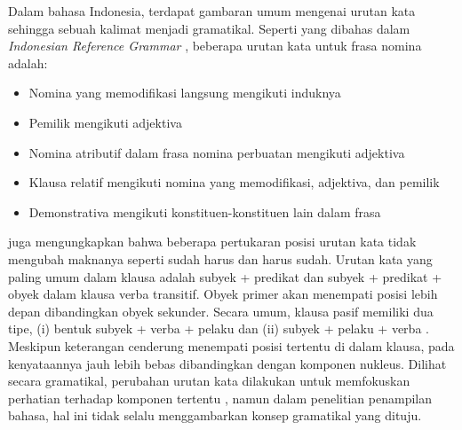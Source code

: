 Dalam bahasa Indonesia, terdapat gambaran umum mengenai urutan kata sehingga sebuah kalimat menjadi gramatikal. Seperti yang dibahas dalam \textit{Indonesian Reference Grammar} \citep{sneddon2010indonesian}, beberapa urutan kata untuk frasa nomina adalah:
\begin{itemize}
\item Nomina yang memodifikasi langsung mengikuti induknya
\item Pemilik mengikuti adjektiva
\item Nomina atributif dalam frasa nomina perbuatan mengikuti adjektiva
\item Klausa relatif mengikuti nomina yang memodifikasi, adjektiva, dan pemilik
\item Demonstrativa mengikuti konstituen-konstituen lain dalam frasa
\end{itemize}

\cite{sneddon2010indonesian} juga mengungkapkan bahwa beberapa pertukaran posisi urutan kata tidak mengubah maknanya seperti sudah harus dan harus sudah. Urutan kata yang paling umum dalam klausa adalah subyek + predikat dan subyek + predikat + obyek dalam klausa verba transitif. Obyek primer akan menempati posisi lebih depan dibandingkan obyek sekunder. Secara umum, klausa pasif memiliki dua tipe, (i) bentuk subyek + verba + pelaku dan (ii) subyek + pelaku + verba \citep{sneddon2010indonesian}. Meskipun keterangan cenderung menempati posisi tertentu di dalam klausa, pada kenyataannya jauh lebih bebas dibandingkan dengan komponen nukleus. Dilihat secara gramatikal, perubahan urutan kata dilakukan untuk memfokuskan perhatian terhadap komponen tertentu \citep{sneddon2010indonesian}, namun dalam penelitian penampilan bahasa, hal ini tidak selalu menggambarkan konsep gramatikal yang dituju.


